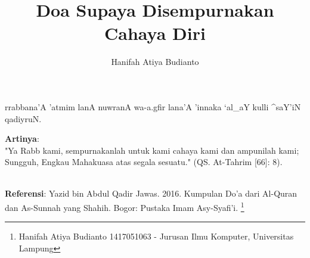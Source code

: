 \documentclass[a4paper,12pt]{article}
\title{\Large Doa Supaya Disempurnakan Cahaya Diri}
\author{\calligra Hanifah Atiya Budianto}
\begin{document}
\sffamily
\maketitle 
\fullvocalize
{}
\begin{arabtext}
\noindent
rrabbana'A 'atmim lanA nuwranA wa-a.gfir lana'A 'innaka `al_aY kulli ^saY'iN 
qadiyruN.\\
\end{arabtext}
\noindent
\textbf{Artinya}:\\
\indent
"Ya Rabb kami, sempurnakanlah untuk kami cahaya kami dan ampunilah kami; 
Sungguh, Engkau Mahakuasa atas segala sesuatu." (QS. At-Tahrim [66]: 8).\\\\
\par
\noindent
\textbf{Referensi}: Yazid bin Abdul Qadir Jawas. 2016. Kumpulan Do'a dari
Al-Quran dan As-Sunnah yang Shahih. Bogor: Pustaka Imam Asy-Syafi'i.
\footnote{Hanifah Atiya Budianto 1417051063 - Jurusan Ilmu Komputer,
Universitas Lampung}
\end{document}
